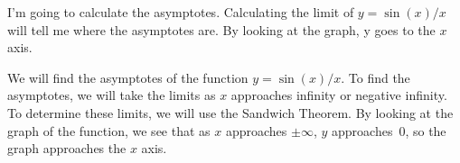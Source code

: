 

      \begin{badexample}
        I'm going to calculate the asymptotes. Calculating the limit
        of $y=\sin(x)/x$ will tell me where the asymptotes are. By
        looking at the graph, y goes to the $x$ axis.
      \end{badexample}

      \begin{goodexample} We will find the asymptotes of the function
      $y=\sin(x)/x$.  To find the asymptotes, we will take the limits
      as $x$ approaches infinity or negative infinity. To determine
      these limits, we will use the Sandwich Theorem.  By looking at
      the graph of the function, we see that as $x$ approaches
      $\pm\infty$, $y$ approaches~0, so the graph approaches the $x$
      axis.  \end{goodexample}

\noindent{}







